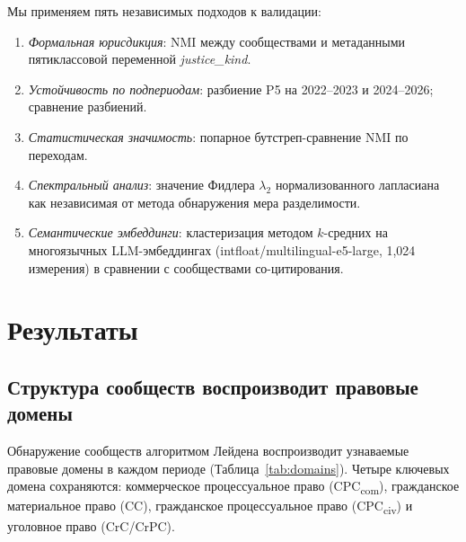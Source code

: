 \documentclass[11pt]{article}
\begin{document}
Мы применяем пять независимых подходов к валидации:
\begin{enumerate}[nosep]
  \item \emph{Формальная юрисдикция}: NMI между сообществами и метаданными пятиклассовой переменной \emph{justice\_kind}.
  \item \emph{Устойчивость по подпериодам}: разбиение P5 на 2022--2023 и 2024--2026; сравнение разбиений.
  \item \emph{Статистическая значимость}: попарное бутстреп-сравнение NMI по переходам.
  \item \emph{Спектральный анализ}: значение Фидлера $\lambda_2$ нормализованного лапласиана как независимая от метода обнаружения мера разделимости.
  \item \emph{Семантические эмбеддинги}: кластеризация методом $k$-средних на многоязычных LLM-эмбеддингах (intfloat/multilingual-e5-large, 1{,}024 измерения) в сравнении с сообществами со-цитирования.
\end{enumerate}

\section{Результаты}
\label{sec:results}

\subsection{Структура сообществ воспроизводит правовые домены}

Обнаружение сообществ алгоритмом Лейдена воспроизводит узнаваемые правовые домены в каждом периоде (Таблица~\ref{tab:domains}).
Четыре ключевых домена сохраняются: коммерческое процессуальное право (CPC\textsubscript{com}), гражданское материальное право (CC), гражданское процессуальное право (CPC\textsubscript{civ}) и уголовное право (CrC/CrPC).
\end{document}
